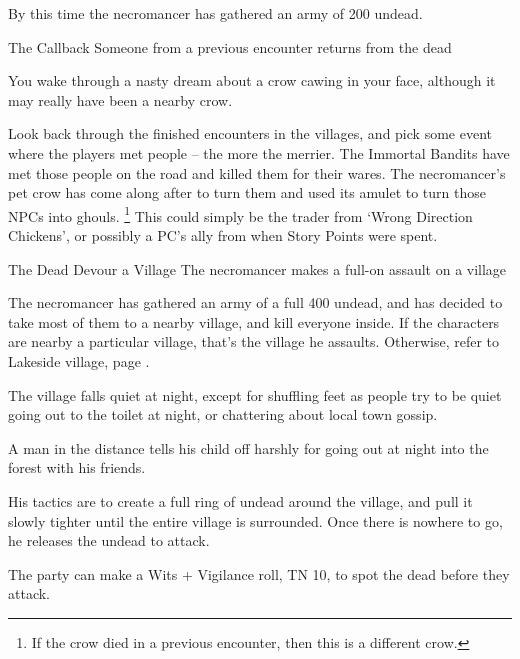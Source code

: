 \begin{multicols}{2}
By this time the necromancer has gathered an army of 200 undead.

{The Callback}%
{Someone from a previous encounter returns from the dead}%

\begin{boxtext}

	You wake through a nasty dream about a crow cawing in your face, although it may really have been a nearby crow.

\end{boxtext}

Look back through the finished encounters in the villages, and pick some event where the players met people -- the more the merrier.
The Immortal Bandits have met those people on the road and killed them for their wares.
The necromancer's pet crow has come along after to turn them and used its amulet to turn those NPCs into ghouls.
\footnote{If the crow died in a previous encounter, then this is a different crow.}
This could simply be the trader from `Wrong Direction Chickens', or possibly a PC's ally from when Story Points were spent.


{The Dead Devour a Village}%
{The necromancer makes a full-on assault on a village}%

The necromancer has gathered an army of a full 400 undead, and has decided to take most of them to a nearby village, and kill everyone inside.
If the characters are nearby a particular village, that's the village he assaults.
Otherwise, refer to Lakeside village, page \pageref{lakeside}.

\begin{boxtext}
	The village falls quiet at night, except for shuffling feet as people try to be quiet going out to the toilet at night, or chattering about local town gossip.

	A man in the distance tells his child off harshly for going out at night into the forest with his friends.
\end{boxtext}

His tactics are to create a full ring of undead around the village, and pull it slowly tighter until the entire village is surrounded.
Once there is nowhere to go, he releases the undead to attack.

The party can make a Wits + Vigilance roll, TN 10, to spot the dead before they attack.

\begin{rollchart}


\end{rollchart}
\end{multicols}
